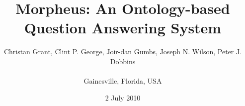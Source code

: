 \documentclass{sig-alternate}
\begin{document}
%

\title{{\ttlit Morpheus}: An Ontology-based Question Answering System}

%
%
%
%
%

\author{
	 \alignauthor Christan Grant, Clint P. George, Joir-dan Gumbs, Joseph N. Wilson, Peter J. Dobbins \\
	  \\ \affaddr
{ Gainesville, Florida, USA} \\
}

\date{2 July 2010}


\maketitle



\end{document}
